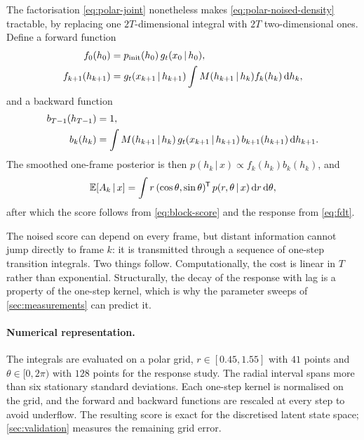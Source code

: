 \documentclass[11pt,a4paper]{article}
\newcommand{\E}{\mathbb{E}}
\newcommand{\given}{\,\vert\,}
\newcommand{\dd}{\,\mathrm d}
\newcommand{\T}{^{\mkern-1.5mu\mathsf{T}}}
\begin{document}
The factorisation \eqref{eq:polar-joint} nonetheless makes \eqref{eq:polar-noised-density}
tractable, by replacing one $2T$-dimensional integral with $2T$ two-dimensional ones. Define a
forward function
\begin{align}
 f_0(h_0)&=p_{\mathrm{init}}(h_0)\,g_t(x_0\given h_0),\notag\\
 f_{k+1}(h_{k+1})&=g_t(x_{k+1}\given h_{k+1})
 \int M(h_{k+1}\given h_k)f_k(h_k)\dd h_k ,
 \label{eq:forward-recursion}
\end{align}
and a backward function
\begin{align}
 b_{T-1}(h_{T-1})&=1,\notag\\
 b_k(h_k)&=\int M(h_{k+1}\given h_k)\,g_t(x_{k+1}\given h_{k+1})\,b_{k+1}(h_{k+1})
 \dd h_{k+1} .
 \label{eq:backward-recursion}
\end{align}
The smoothed one-frame posterior is then $p(h_k\given x)\propto f_k(h_k)b_k(h_k)$, and
\begin{equation}
 \E[A_k\given x]=\int r\,(\cos\theta,\sin\theta)\T\,p(r,\theta\given x)\dd r\dd\theta ,
 \label{eq:polar-posterior-mean}
\end{equation}
after which the score follows from \eqref{eq:block-score} and the response from
\eqref{eq:fdt}.

\begin{intuition}
The noised score can depend on every frame, but distant information cannot jump directly to
frame $k$: it is transmitted through a sequence of one-step transition integrals. Two things
follow. Computationally, the cost is linear in $T$ rather than exponential. Structurally, the
decay of the response with lag is a property of the one-step kernel, which is why the
parameter sweeps of \cref{sec:measurements} can predict it.
\end{intuition}

\paragraph{Numerical representation.} The integrals are evaluated on a polar grid,
$r\in[0.45,1.55]$ with $41$ points and $\theta\in[0,2\pi)$ with $128$ points for the response
study. The radial interval spans more than six stationary standard deviations. Each one-step
kernel is normalised on the grid, and the forward and backward functions are rescaled at every
step to avoid underflow. The resulting score is exact for the discretised latent state space;
\cref{sec:validation} measures the remaining grid error.
\end{document}
